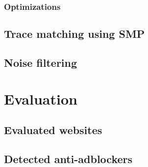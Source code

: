 \documentclass[en]{pracamgr}
\begin{document}
\subsection{Optimizations}
\section{Trace matching using SMP}
\section{Noise filtering}

\chapter{Evaluation}
\section{Evaluated websites}
\section{Detected anti-adblockers}


{}

\end{document}
